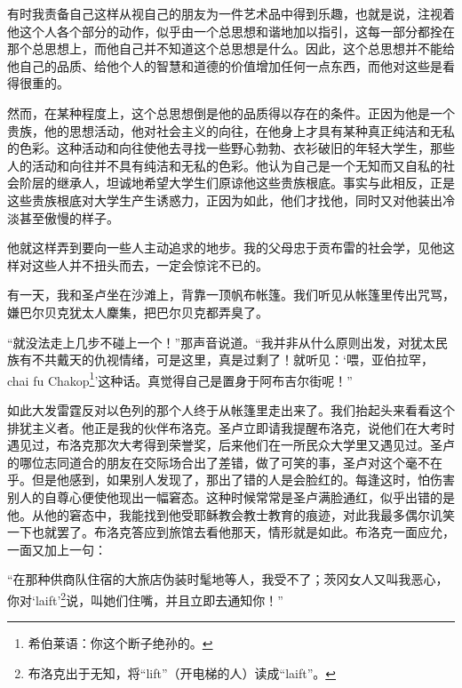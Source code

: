 \par 有时我责备自己这样从视自己的朋友为一件艺术品中得到乐趣，也就是说，注视着他这个人各个部分的动作，似乎由一个总思想和谐地加以指引，这每一部分都拴在那个总思想上，而他自己并不知道这个总思想是什么。因此，这个总思想并不能给他自己的品质、给他个人的智慧和道德的价值增加任何一点东西，而他对这些是看得很重的。
\par 然而，在某种程度上，这个总思想倒是他的品质得以存在的条件。正因为他是一个贵族，他的思想活动，他对社会主义的向往，在他身上才具有某种真正纯洁和无私的色彩。这种活动和向往使他去寻找一些野心勃勃、衣衫破旧的年轻大学生，那些人的活动和向往并不具有纯洁和无私的色彩。他认为自己是一个无知而又自私的社会阶层的继承人，坦诚地希望大学生们原谅他这些贵族根底。事实与此相反，正是这些贵族根底对大学生产生诱惑力，正因为如此，他们才找他，同时又对他装出冷淡甚至傲慢的样子。
\par 他就这样弄到要向一些人主动追求的地步。我的父母忠于贡布雷的社会学，见他这样对这些人并不扭头而去，一定会惊诧不已的。
\par 有一天，我和圣卢坐在沙滩上，背靠一顶帆布帐篷。我们听见从帐篷里传出咒骂，嫌巴尔贝克犹太人麇集，把巴尔贝克都弄臭了。
\par “就没法走上几步不碰上一个！”那声音说道。“我并非从什么原则出发，对犹太民族有不共戴天的仇视情绪，可是这里，真是过剩了！就听见：‘喂，亚伯拉罕，chai fu Chakop\footnote{希伯莱语：你这个断子绝孙的。}’这种话。真觉得自己是置身于阿布吉尔街呢！”
\par 如此大发雷霆反对以色列的那个人终于从帐篷里走出来了。我们抬起头来看看这个排犹主义者。他正是我的伙伴布洛克。圣卢立即请我提醒布洛克，说他们在大考时遇见过，布洛克那次大考得到荣誉奖，后来他们在一所民众大学里又遇见过。圣卢的哪位志同道合的朋友在交际场合出了差错，做了可笑的事，圣卢对这个毫不在乎。但是他感到，如果别人发现了，那出了错的人是会脸红的。每逢这时，怕伤害别人的自尊心便使他现出一幅窘态。这种时候常常是圣卢满脸通红，似乎出错的是他。从他的窘态中，我能找到他受耶稣教会教士教育的痕迹，对此我最多偶尔讥笑一下也就罢了。布洛克答应到旅馆去看他那天，情形就是如此。布洛克一面应允，一面又加上一句：
\par “在那种供商队住宿的大旅店伪装时髦地等人，我受不了；茨冈女人又叫我恶心，你对‘laift’\footnote{布洛克出于无知，将“lift”（开电梯的人）读成“laift”。}说，叫她们住嘴，并且立即去通知你！”
